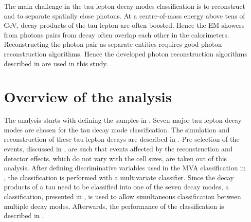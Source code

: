 The main challenge in the tau lepton decay modes  classification is to reconstruct and to separate spatially close photons. At a centre-of-mass energy above tens of GeV, decay products of the tau lepton are often boosted.  Hence the EM showers from photons pairs from \Ppizero decay often overlap each other in the calorimeters.  Reconstructing the photon pair as separate entities requires good photon reconstruction algorithms. Hence the developed photon reconstruction algorithms described in  are used in this study.







%



\section{Overview of the analysis}

The analysis starts with defining the samples in . Seven major tau lepton decay modes are chosen for the tau decay mode classification. The simulation and reconstruction of these tau lepton decays are described in .  Pre-selection of the events, discussed in , are such that events affected by the reconstruction and detector effects, which do not vary with the \ECAL cell sizes, are taken out of this analysis. After defining discriminative variables used in the MVA classification in , the classification is performed with a multivariate classifier. Since the decay products of a tau need to be classified into one of the seven decay modes, a \multiclass classification, presented in , is used to allow simultaneous classification between  multiple decay modes. Afterwards, the performance of the classification is described in .

